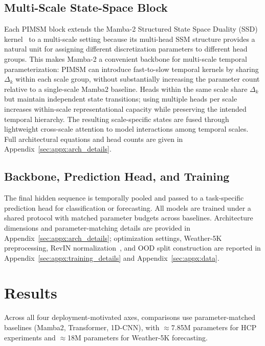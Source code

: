 \documentclass{article}
\begin{document}
\subsection{Multi-Scale State-Space Block}

Each PIMSM block extends the Mamba-2 Structured State Space Duality (SSD) kernel~\citep{dao2024transformers} to a multi-scale setting because its multi-head SSM structure provides a natural unit for assigning different discretization parameters to different head groups. This makes Mamba-2 a convenient backbone for multi-scale temporal parameterization: PIMSM can introduce fast-to-slow temporal kernels by sharing $\Delta_k$ within each scale group, without substantially increasing the parameter count relative to a single-scale Mamba2 baseline. Heads within the same scale share $\Delta_k$ but maintain independent state transitions; using multiple heads per scale increases within-scale representational capacity while preserving the intended temporal hierarchy. The resulting scale-specific states are fused through lightweight cross-scale attention to model interactions among temporal scales. Full architectural equations and head counts are given in Appendix~\ref{sec:appx:arch_details}.

\subsection{Backbone, Prediction Head, and Training}
\label{sec:methods:training}

The final hidden sequence is temporally pooled and passed to a task-specific prediction head for classification or forecasting. All models are trained under a shared protocol with matched parameter budgets across baselines. Architecture dimensions and parameter-matching details are provided in Appendix~\ref{sec:appx:arch_details}; optimization settings, Weather-5K preprocessing, RevIN normalization~\citep{kim2021reversible}, and OOD split construction are reported in Appendix~\ref{sec:appx:training_details} and Appendix~\ref{sec:appx:data}.


\section{Results}\label{sec:results}

Across all four deployment-motivated axes, comparisons use parameter-matched baselines (Mamba2, Transformer, 1D-CNN), with $\approx$7.85M parameters for HCP experiments and $\approx$18M parameters for Weather-5K forecasting.
\end{document}
